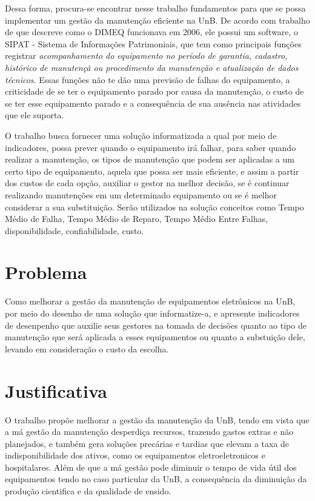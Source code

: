 Dessa forma, procura-se encontrar nesse trabalho fundamentos para que se possa implementar um gestão da manutenção eficiente na UnB. De acordo com trabalho de \cite{limacastilho2006} que descreve como o DIMEQ funcionava em 2006, ele possui um software, o SIPAT - Sistema de Informações Patrimoniais, que tem como principais funções registrar \emph{acompanhamento do equipamento no período de garantia, cadastro, histórico de manutençã ou procedimento da manutenção e atualização de dados técnicos}. Essas funções não te dão uma previsão de falhas do equipamento, a criticidade de se ter o equipamento parado por causa da manutenção, o custo de se ter esse equipamento parado e a consequência de sua ausência nas atividades que ele suporta.

O trabalho busca fornecer uma solução informatizada a qual por meio de indicadores, possa prever quando o equipamento irá falhar, para saber quando realizar a manutenção, os tipos de manutenção que podem ser aplicadas a um certo tipo de equipamento, aquela que possa ser mais eficiente, e assim a partir dos custos de cada opção, auxiliar o gestor na melhor decisão, se é continuar realizando manutenções em um determinado equipamento ou se é melhor considerar a sua substituição. Serão utilizados na solução conceitos como Tempo Médio de Falha, Tempo Médio de Reparo, Tempo Médio Entre Falhas, disponibilidade, confiabilidade, custo. 



\section{Problema}

Como melhorar a gestão da manutenção de equipamentos eletrônicos na UnB, por meio do desenho de uma solução que informatize-a, e apresente indicadores de desenpenho que auxilie seus gestores na tomada de decisões quanto ao tipo de manutenção que será aplicada a esses equipamentos ou quanto a substuição dele, levando em consideração o custo da escolha. 


\section{Justificativa}

O trabalho propõe melhorar a gestão da manutenção da UnB, tendo em vista que a má gestão da manutenção desperdiça recursos, trazendo gastos extras e não planejados, e também gera soluções precárias e tardias que elevam a taxa de indisponibilidade dos ativos, como os equipamentos eletroeletronicos e hospitalares. Além de que a má gestão pode diminuir o tempo de vida útil dos equipamentos tendo no caso particular da UnB, a consequência da diminuição da produção cientifica e da qualidade de ensido.

